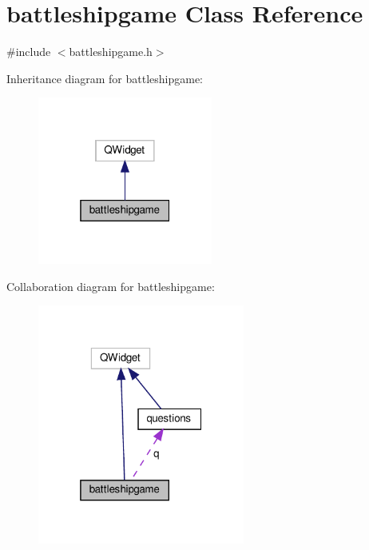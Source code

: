 \hypertarget{classbattleshipgame}{}\section{battleshipgame Class Reference}
\label{classbattleshipgame}


{\ttfamily \#include $<$battleshipgame.\+h$>$}



Inheritance diagram for battleshipgame\+:
\nopagebreak
\begin{figure}[H]
\begin{center}
\leavevmode
\includegraphics[width=163pt]{classbattleshipgame__inherit__graph}
\end{center}
\end{figure}


Collaboration diagram for battleshipgame\+:
\nopagebreak
\begin{figure}[H]
\begin{center}
\leavevmode
\includegraphics[width=193pt]{classbattleshipgame__coll__graph}
\end{center}
\end{figure}
